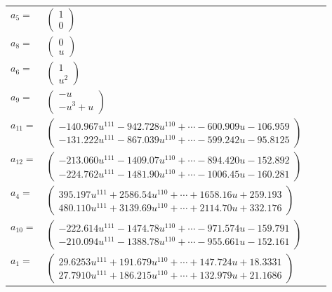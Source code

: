 \documentclass[1p]{elsarticle_modified}
\theoremstyle{definition}
\begin{document}
\begin{tabular}{m{7pt} m{180pt} m{7pt} m{180pt} }
\flushright $a_{5}=$&$\begin{pmatrix}1\\0\end{pmatrix}$ \\
\flushright $a_{8}=$&$\begin{pmatrix}0\\u\end{pmatrix}$ \\
\flushright $a_{6}=$&$\begin{pmatrix}1\\u^2\end{pmatrix}$ \\
\flushright $a_{9}=$&$\begin{pmatrix}- u\\- u^3+u\end{pmatrix}$ \\
\flushright $a_{11}=$&$\begin{pmatrix}-140.967 u^{111}-942.728 u^{110}+\cdots-600.909 u-106.959\\-131.222 u^{111}-867.039 u^{110}+\cdots-599.242 u-95.8125\end{pmatrix}$ \\
\flushright $a_{12}=$&$\begin{pmatrix}-213.060 u^{111}-1409.07 u^{110}+\cdots-894.420 u-152.892\\-224.762 u^{111}-1481.90 u^{110}+\cdots-1006.45 u-160.281\end{pmatrix}$ \\
\flushright $a_{4}=$&$\begin{pmatrix}395.197 u^{111}+2586.54 u^{110}+\cdots+1658.16 u+259.193\\480.110 u^{111}+3139.69 u^{110}+\cdots+2114.70 u+332.176\end{pmatrix}$ \\
\flushright $a_{10}=$&$\begin{pmatrix}-222.614 u^{111}-1474.78 u^{110}+\cdots-971.574 u-159.791\\-210.094 u^{111}-1388.78 u^{110}+\cdots-955.661 u-152.161\end{pmatrix}$ \\
\flushright $a_{1}=$&$\begin{pmatrix}29.6253 u^{111}+191.679 u^{110}+\cdots+147.724 u+18.3331\\27.7910 u^{111}+186.215 u^{110}+\cdots+132.979 u+21.1686\end{pmatrix}$ \\

\end{tabular}
\end{document}
